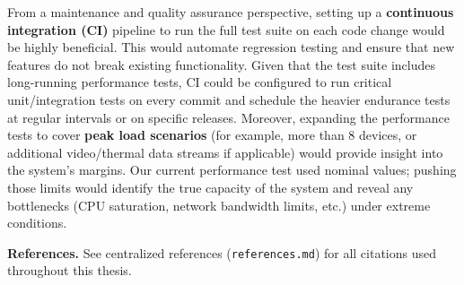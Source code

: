 From a maintenance and quality assurance perspective, setting up a \textbf{continuous integration (CI)} pipeline to run the full test suite on each code change would be highly beneficial. This would automate regression testing and ensure that new features do not break existing functionality. Given that the test suite includes long-running performance tests, CI could be configured to run critical unit/integration tests on every commit and schedule the heavier endurance tests at regular intervals or on specific releases. Moreover, expanding the performance tests to cover \textbf{peak load scenarios} (for example, more than 8 devices, or additional video/thermal data streams if applicable) would provide insight into the system's margins. Our current performance test used nominal values; pushing those limits would identify the true capacity of the system and reveal any bottlenecks (CPU saturation, network bandwidth limits, etc.) under extreme conditions.

\bigskip
\noindent\textbf{References.} See centralized references (\texttt{references.md}) for all citations used throughout this thesis.
